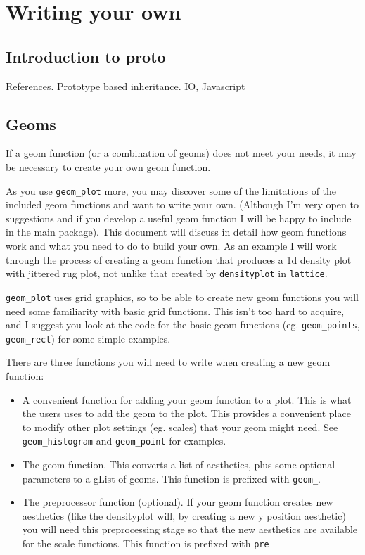 

\chapter{Writing your own}

\section{Introduction to proto} %
\label{sec:introduction_to_proto}

References.
Prototype based inheritance.  IO, Javascript


\section{Geoms}\label{sec:writing_your_own}

If a geom function (or a combination of geoms) does not meet your needs, it may be necessary to create your own geom function.  

As you use {\tt geom\_plot} more, you may discover some of the limitations of the included geom functions and want to write your own.  (Although I'm very open to suggestions and if you develop a useful geom function I will be happy to include in the main package).  This document will discuss in detail how geom functions work and what you need to do to build your own.  As an example I will work through the process of creating a geom function that produces a 1d density plot with jittered rug plot, not unlike that created by {\tt densityplot} in {\tt lattice}.

{\tt geom\_plot} uses grid graphics, so to be able to create new geom functions you will need some familiarity with basic grid functions.  This isn't too hard to acquire, and I suggest you look at the code for the basic geom functions (eg. {\tt geom\_points}, {\tt geom\_rect}) for some simple examples.

There are three functions you will need to write when creating a new geom function:

\begin{itemize}
	\item A convenient function for adding your geom function to a plot.  This is what the users uses to add the geom to the plot.  This provides a convenient place to modify other plot settings (eg. scales) that your geom might need.  See {\tt geom\_histogram} and {\tt geom\_point} for examples.

	\item The geom function.  This converts a list of aesthetics, plus some optional parameters to a gList of geoms.  This function is prefixed with {\tt geom\_}.  
	
	\item The preprocessor function (optional).  If your geom function creates new aesthetics (like the densityplot will, by creating a new y position aesthetic) you will need this preprocessing stage so that the new aesthetics are available for the scale functions.  This function is prefixed with {\tt pre\_}
\end{itemize}


